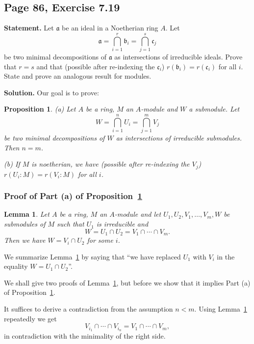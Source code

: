 \documentclass[parskip=half,fontsize=12pt]{scrartcl}%
\newcommand{\mf}{\mathfrak}
\newcommand{\aaa}{\mf a}
\newcommand{\bbb}{\mf b}
\newcommand{\ccc}{\mf c}
\newtheorem{lem}[thm]{Lemma}
\newtheorem{prop}[thm]{Proposition}
\begin{document}
\subsection{Page 86, Exercise 7.19}%

\textbf{Statement.} Let $\aaa$ be an ideal in a Noetherian ring $A$. Let 
$$
\mathfrak{a}=\bigcap_{i=1}^r\mathfrak{b}_i=\bigcap_{j=1}^s\mathfrak{c}_j
$$ 
be two minimal decompositions of $\aaa$ as intersections of irreducible ideals. Prove that $r=s$ and that (possible after re-indexing the $\ccc_i$) $r(\bbb_i)=r(\ccc_i)$ for all $i$. State and prove an analogous result for modules.

\textbf{Solution.} Our goal is to prove:

\begin{prop}\label{719P1}
(a) Let $A$ be a ring, $M$ an $A$-module and $W$ a submodule. Let 
$$
W=\bigcap_{i=1}^nU_i=\bigcap_{j=1}^mV_j
$$ 
be two minimal decompositions of $W$ as intersections of irreducible submodules. Then $n=m$.

(b) If $M$ is noetherian, we have (possible after re-indexing the $V_j$) $r(U_i:M)=r(V_i:M)$ for all $i$.
\end{prop}

\subsubsection{Proof of Part (a) of Proposition~\ref{719P1}}%


\begin{lem}\label{719L2}
Let $A$ be a ring, $M$ an $A$-module and let $U_1,U_2,V_1,\dots,V_m,W$ be submodules of $M$ such that $U_1$ is irreducible and 
$$
W=U_1\cap U_2=V_1\cap\cdots\cap V_m.
$$ 
Then we have $W=V_i\cap U_2$ for some $i$. 
\end{lem} 

We summarize Lemma~\ref{719L2} by saying that ``we have replaced $U_1$ with $V_i$ in the equality $W=U_1\cap U_2$''.

We shall give two proofs of Lemma~\ref{719L2}, but before we show that it implies Part (a) of Proposition~\ref{719P1}.

It suffices to derive a contradiction from the assumption $n<m$. Using Lemma~\ref{719L2} repeatedly we get 
$$
V_{i_1}\cap\cdots\cap V_{i_n}=V_1\cap\cdots\cap V_m,
$$ 
in contradiction with the minimality of the right side.
\end{document}
